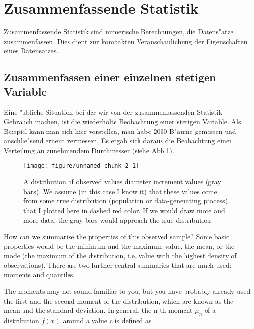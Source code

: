 \documentclass[a4paper,twoside]{tufte-book}\usepackage[]{graphicx}\usepackage[]{color}
\makeatletter
\def\maxwidth{ %
  \ifdim\Gin@nat@width>\linewidth
    \linewidth
  \else
    \Gin@nat@width
  \fi
}
\makeatother
\begin{document}
\section{Zusammenfassende Statistik}

Zusammenfassende Statistik sind numerische Berechnungen, die Datens"atze zusammenfassen. Dies dient zur kompakten Veranschaulichung der Eigenschaften eines Datensatzes.

\subsection{Zusammenfassen einer einzelnen stetigen Variable}

Eine "ubliche Situation bei der wir von der zusammenfassenden Statistik Gebrauch machen, ist die wiederholte Beobachtung einer stetigen Variable. Als Beispiel kann man sich hier vorstellen, man habe 2000 B"aume gemessen und anschlie"send erneut vermessen. Es ergab sich daraus die Beobachtung einer Verteilung an zunehmendem Durchmesser (siehe Abb.\ref{fig: data distribution}).

\begin{figure}[htbp]
\begin{center}
\begin{Schunk}

\texttt{[image: figure/unnamed-chunk-2-1]} \end{Schunk}
\caption{A distribution of observed values diameter increment values (gray bars). We assume (in this case I know it) that these values come from some true distribution (population or data-generating process) that I plotted here in dashed red color. If we would draw more and more data, the gray bars would approach the true distribution}
\label{fig: data distribution}
\end{center}
\end{figure}

How can we summarize the properties of this observed sample? Some basic properties would be the minimum and the maximum value, the mean, or the mode (the maximum of the distribution, i.e. value with the highest density of observations). There are two further central summaries that are much used: moments and quantiles.

The moments may not sound familiar to you, but you have probably already used the first and the second moment of the distribution, which are known as the mean and the standard deviation. In general, the n-th moment $\mu_n$ of a distribution $f(x)$ around a value c is defined as 
\end{document}
